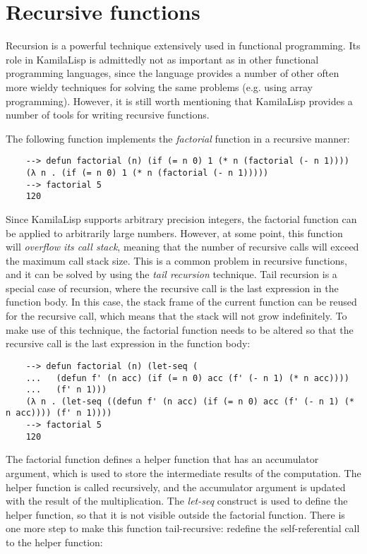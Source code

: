 \section{Recursive functions}

Recursion is a powerful technique extensively used in functional programming. Its role in KamilaLisp is admittedly not as important as in other functional programming languages, since the language provides a number of other often more wieldy techniques for solving the same problems (e.g. using array programming). However, it is still worth mentioning that KamilaLisp provides a number of tools for writing recursive functions.

The following function implements the \textit{factorial} function in a recursive manner:

\begin{Verbatim}
    --> defun factorial (n) (if (= n 0) 1 (* n (factorial (- n 1))))
    (λ n . (if (= n 0) 1 (* n (factorial (- n 1)))))
    --> factorial 5
    120
\end{Verbatim}

Since KamilaLisp supports arbitrary precision integers, the factorial function can be applied to arbitrarily large numbers. However, at some point, this function will \textit{overflow its call stack}, meaning that the number of recursive calls will exceed the maximum call stack size. This is a common problem in recursive functions, and it can be solved by using the \textit{tail recursion} technique. Tail recursion is a special case of recursion, where the recursive call is the last expression in the function body. In this case, the stack frame of the current function can be reused for the recursive call, which means that the stack will not grow indefinitely. To make use of this technique, the factorial function needs to be altered so that the recursive call is the last expression in the function body:

\begin{Verbatim}
    --> defun factorial (n) (let-seq (
    ...   (defun f' (n acc) (if (= n 0) acc (f' (- n 1) (* n acc))))
    ...   (f' n 1)))
    (λ n . (let-seq ((defun f' (n acc) (if (= n 0) acc (f' (- n 1) (* n acc)))) (f' n 1))))
    --> factorial 5
    120
\end{Verbatim}

The factorial function defines a helper function that has an accumulator argument, which is used to store the intermediate results of the computation. The helper function is called recursively, and the accumulator argument is updated with the result of the multiplication. The \textit{let-seq} construct is used to define the helper function, so that it is not visible outside the factorial function. There is one more step to make this function tail-recursive: redefine the self-referential call to the helper function:

